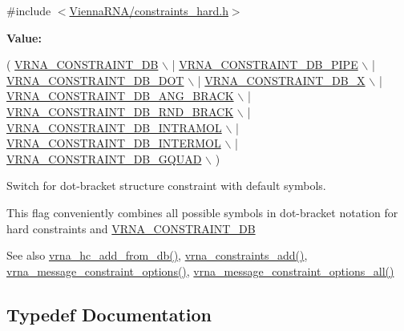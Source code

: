 {\ttfamily \#include $<$\hyperlink{constraints__hard_8h}{Vienna\+R\+N\+A/constraints\+\_\+hard.\+h}$>$}

{\bfseries Value\+:}
\begin{DoxyCode}
(   \hyperlink{group__hard__constraints_ga4bfc2f15c4f261c62a11af9d2aa80c90}{VRNA\_CONSTRAINT\_DB} \(\backslash\)
      | \hyperlink{group__hard__constraints_ga13053547a2de5532b64b64d35e097ae1}{VRNA\_CONSTRAINT\_DB\_PIPE} \(\backslash\)
      | \hyperlink{group__hard__constraints_ga369bea82eae75fbe626f409fa425747e}{VRNA\_CONSTRAINT\_DB\_DOT} \(\backslash\)
      | \hyperlink{group__hard__constraints_ga7283bbe0f8954f7b030ecc3f2d1932b2}{VRNA\_CONSTRAINT\_DB\_X} \(\backslash\)
      | \hyperlink{constraints__hard_8h_ad54c1315a47d55653dcaa5de6e544b77}{VRNA\_CONSTRAINT\_DB\_ANG\_BRACK} \(\backslash\)
      | \hyperlink{group__hard__constraints_gac17b034852c914bc5879954c65d7e74b}{VRNA\_CONSTRAINT\_DB\_RND\_BRACK} \(\backslash\)
      | \hyperlink{group__hard__constraints_ga5c17253f5a39d1d49b0fb11f5196982a}{VRNA\_CONSTRAINT\_DB\_INTRAMOL} \(\backslash\)
      | \hyperlink{group__hard__constraints_ga31d0ebb9755ca8a4acafc14f00ca755d}{VRNA\_CONSTRAINT\_DB\_INTERMOL} \(\backslash\)
      | \hyperlink{group__hard__constraints_ga75cfab03cdc97c95b3ce8bb29f52b08e}{VRNA\_CONSTRAINT\_DB\_GQUAD} \(\backslash\)
    )
\end{DoxyCode}


Switch for dot-\/bracket structure constraint with default symbols. 

This flag conveniently combines all possible symbols in dot-\/bracket notation for hard constraints and \hyperlink{group__hard__constraints_ga4bfc2f15c4f261c62a11af9d2aa80c90}{V\+R\+N\+A\+\_\+\+C\+O\+N\+S\+T\+R\+A\+I\+N\+T\+\_\+\+D\+B}

\begin{DoxySeeAlso}{See also}
\hyperlink{group__hard__constraints_ga5b4de3247b67358080c176b94591a8e6}{vrna\+\_\+hc\+\_\+add\+\_\+from\+\_\+db()}, \hyperlink{group__constraints_ga35a401f680969a556858a8dd5f1d07cc}{vrna\+\_\+constraints\+\_\+add()}, \hyperlink{group__constraints_gaa1f20b53bf09ac2e6b0dbb13f7d89670}{vrna\+\_\+message\+\_\+constraint\+\_\+options()}, \hyperlink{group__constraints_gaec7e13fa0465c2acc7a621d1aecb709f}{vrna\+\_\+message\+\_\+constraint\+\_\+options\+\_\+all()} 
\end{DoxySeeAlso}


\subsection{Typedef Documentation}
\hypertarget{group__hard__constraints_ga16eb71ac9a7a35369be2eaa9d8f8dfa0}{}
